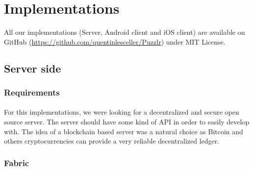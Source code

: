 \section{Implementations}
	\paragraph{}
	All our implementations (Server, Android client and iOS client) are available on GitHub (\url{https://github.com/quentinlesceller/Puzzlr}) under MIT License.
	\subsection{Server side}
 		\subsubsection{Requirements}
 		 	\paragraph{}
 			For this implementations, we were looking for a decentralized and secure open source server. The server should have some kind of API in order to easily develop with. The idea of a blockchain based server was a natural choice as Bitcoin and others cryptocurrencies can provide a very reliable decentralized ledger.
 			\subsubsection{Fabric} 
